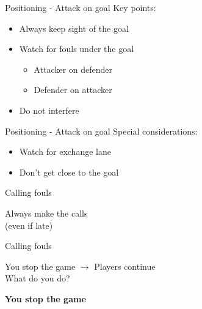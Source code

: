 \documentclass{beamer}
\begin{document}
    \begin{frame}{Positioning - Attack on goal}
        Key points:
        \begin{itemize}
            \item Always keep sight of the goal
            \item Watch for fouls under the goal
            \begin{itemize}
                \item Attacker on defender
                \item Defender on attacker
            \end{itemize}
            \item Do not interfere
        \end{itemize}
    \end{frame}

    \begin{frame}{Positioning - Attack on goal}
        Special considerations:
        \begin{itemize}
            \item Watch for exchange lane
            \item Don't get close to the goal
        \end{itemize}
    \end{frame}

    \begin{frame}{Calling fouls}
        \begin{center}
            Always make the calls \\
            (even if late)
        \end{center}
    \end{frame}

    \begin{frame}{Calling fouls}
        \begin{center}
        You stop the game \pause $\rightarrow$ Players continue \\
        What do you do? \\

        \pause

        \textbf{You stop the game}
        \end{center}
    \end{frame}
\end{document}
